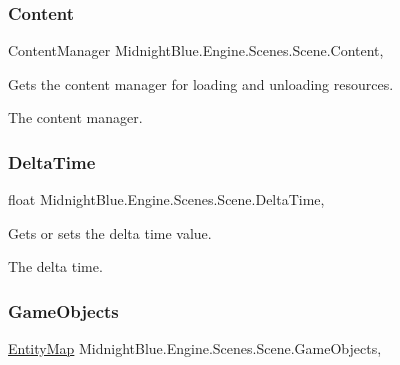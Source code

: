\subsubsection{\texorpdfstring{Content}{Content}}
{\footnotesize\ttfamily Content\+Manager Midnight\+Blue.\+Engine.\+Scenes.\+Scene.\+Content\hspace{0.3cm}{\ttfamily [get]}, {\ttfamily [protected]}}



Gets the content manager for loading and unloading resources. 

The content manager.\hypertarget{class_midnight_blue_1_1_engine_1_1_scenes_1_1_scene_a51414d69565d89db676b16932f3822e9}{}\label{class_midnight_blue_1_1_engine_1_1_scenes_1_1_scene_a51414d69565d89db676b16932f3822e9} 
\subsubsection{\texorpdfstring{Delta\+Time}{DeltaTime}}
{\footnotesize\ttfamily float Midnight\+Blue.\+Engine.\+Scenes.\+Scene.\+Delta\+Time\hspace{0.3cm}{\ttfamily [get]}, {\ttfamily [set]}}



Gets or sets the delta time value. 

The delta time.\hypertarget{class_midnight_blue_1_1_engine_1_1_scenes_1_1_scene_adbcdbbf88e88d55d673cd5be8c79555c}{}\label{class_midnight_blue_1_1_engine_1_1_scenes_1_1_scene_adbcdbbf88e88d55d673cd5be8c79555c} 
\subsubsection{\texorpdfstring{Game\+Objects}{GameObjects}}
{\footnotesize\ttfamily \hyperlink{class_midnight_blue_1_1_engine_1_1_entity_component_1_1_entity_map}{Entity\+Map} Midnight\+Blue.\+Engine.\+Scenes.\+Scene.\+Game\+Objects\hspace{0.3cm}{\ttfamily [get]}, {\ttfamily [protected]}}



